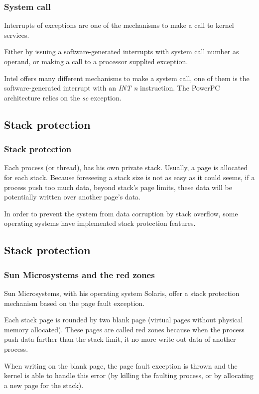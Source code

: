 \begin{frame}
  \frametitle{System call}

Interrupts of exceptions are one of the mechanisms to make a call to kernel services.

\-

Either by issuing a software-generated interrupts with system call number as operand, or making a call to a processor supplied exception. 

\-

Intel offers many different mechanisms to make a system call, one of them is the software-generated interrupt with an \textit{INT n} instruction. The PowerPC architecture relies on the \textit{sc} exception.

\end{frame}


\subsection{Stack protection}

\begin{frame}
  \frametitle{Stack protection}

Each process (or thread), has his own private stack. Usually, a page is allocated for each stack. Because foreseeing a stack size is not as easy as it could seems, if a process push too much data, beyond stack's page limits, these data will be potentially written over another page's data.

\-

In order to prevent the system from data corruption by stack overflow, some operating systems have implemented stack protection features.

\end{frame}


\subsection{Stack protection}

\begin{frame}
  \frametitle{Sun Microsystems and the red zones}

Sun Microsystems, with his operating system Solaris, offer a stack protection mechanism based on the page fault exception.

\-

Each stack page is rounded by two blank page (virtual pages without physical memory allocated). These pages are called red zones because when the process push data farther than the stack limit, it no more write out data of another process.

\-

When writing on the blank page, the page fault exception is thrown and the kernel is able to handle this error (by killing the faulting process, or by allocating a new page for the stack).

\end{frame}

